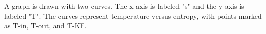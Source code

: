 A graph is drawn with two curves. The x-axis is labeled "s" and the y-axis is labeled "T".  
The curves represent temperature versus entropy, with points marked as T-in, T-out, and T-KF.